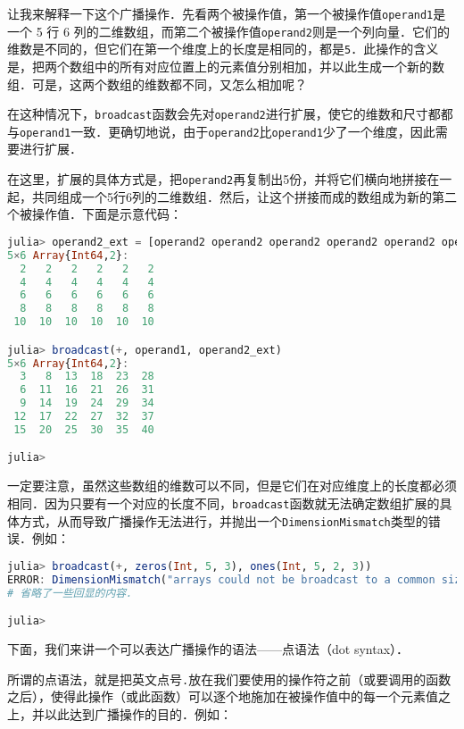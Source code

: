 让我来解释一下这个广播操作．先看两个被操作值，第一个被操作值\verb|operand1|是一个 5 行 6 列的二维数组，而第二个被操作值\verb|operand2|则是一个列向量．它们的维数是不同的，但它们在第一个维度上的长度是相同的，都是\verb|5|．此操作的含义是，把两个数组中的所有对应位置上的元素值分别相加，并以此生成一个新的数组．可是，这两个数组的维数都不同，又怎么相加呢？

在这种情况下，\verb|broadcast|函数会先对\verb|operand2|进行扩展，使它的维数和尺寸都都与\verb|operand1|一致．更确切地说，由于\verb|operand2|比\verb|operand1|少了一个维度，因此需要进行扩展．

在这里，扩展的具体方式是，把\verb|operand2|再复制出5份，并将它们横向地拼接在一起，共同组成一个5行6列的二维数组．然后，让这个拼接而成的数组成为新的第二个被操作值．下面是示意代码：

\begin{lstlisting}[language=julia]
julia> operand2_ext = [operand2 operand2 operand2 operand2 operand2 operand2]
5×6 Array{Int64,2}:
  2   2   2   2   2   2
  4   4   4   4   4   4
  6   6   6   6   6   6
  8   8   8   8   8   8
 10  10  10  10  10  10

julia> broadcast(+, operand1, operand2_ext)
5×6 Array{Int64,2}:
  3   8  13  18  23  28
  6  11  16  21  26  31
  9  14  19  24  29  34
 12  17  22  27  32  37
 15  20  25  30  35  40

julia> 
\end{lstlisting}

一定要注意，虽然这些数组的维数可以不同，但是它们在对应维度上的长度都必须相同．因为只要有一个对应的长度不同，\verb|broadcast|函数就无法确定数组扩展的具体方式，从而导致广播操作无法进行，并抛出一个\verb|DimensionMismatch|类型的错误．例如：

\begin{lstlisting}[language=julia]
julia> broadcast(+, zeros(Int, 5, 3), ones(Int, 5, 2, 3))
ERROR: DimensionMismatch("arrays could not be broadcast to a common size")
# 省略了一些回显的内容．

julia> 
\end{lstlisting}

下面，我们来讲一个可以表达广播操作的语法——点语法（dot syntax）．

所谓的点语法，就是把英文点号\verb|.|放在我们要使用的操作符之前（或要调用的函数之后），使得此操作（或此函数）可以逐个地施加在被操作值中的每一个元素值之上，并以此达到广播操作的目的．例如：


